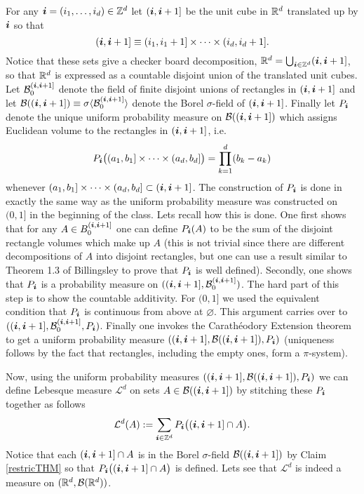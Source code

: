 For any $\boldsymbol i=(i_1,\ldots, i_d)\in\Bbb Z^d$ let $(\boldsymbol i,\boldsymbol i+1]$ be the unit cube in $\Bbb R^d$ translated up by $\boldsymbol i$ so that
\[(\boldsymbol i,\boldsymbol i+1] \equiv (i_1, i_1+1]\times \cdots \times (i_d,i_d + 1].  \]
Notice that these sets give a checker board decomposition, $\Bbb R^d=\bigcup_{\boldsymbol i\in\Bbb Z^d} (\boldsymbol i,\boldsymbol i+1] $, so that $\Bbb R^d$ is expressed as a countable disjoint union of the translated unit cubes. Let $\mathcal B_{0}^{(\boldsymbol i,\boldsymbol i+1] }$ denote the field of finite disjoint unions of rectangles in $(\boldsymbol i,\boldsymbol i+1] $ and let $\mathcal B((\boldsymbol i,\boldsymbol i+1])\equiv \sigma \langle \mathcal B_{0}^{(\boldsymbol i,\boldsymbol i+1] }\rangle $ denote the Borel $\sigma$-field of  $(\boldsymbol i,\boldsymbol i+1]$. Finally let $P_{\boldsymbol i}$ denote the unique uniform probability measure on $\mathcal B((\boldsymbol i,\boldsymbol i+1])$ which assigns Euclidean volume  to the rectangles in  $(\boldsymbol i,\boldsymbol i+1] $, i.e.
\[ P_{\boldsymbol i}\bigl( (a_1,b_1]\times \cdots \times (a_d,b_d]\bigr)=\prod_{k=1}^d (b_k - a_k) \]
whenever $(a_1,b_1]\times \cdots \times (a_d,b_d]\subset (\boldsymbol i,\boldsymbol i+1]$. The construction of $P_{\boldsymbol i}$ is done in exactly the same way as the uniform probability measure was constructed on $(0,1]$ in the beginning of the class. Lets recall how this is done. One first shows that for any $A\in \mathcal \mathcal B_{0}^{(\boldsymbol i,\boldsymbol i+1] }$ one can define $P_{\boldsymbol i}(A)$ to be the sum  of the disjoint rectangle volumes which make up $A$ (this is not trivial since there are different decompositions of $A$ into disjoint rectangles, but one can use a result similar to Theorem 1.3 of Billingsley to prove that $P_{\boldsymbol i}$ is well defined).  Secondly, one shows that $P_{\boldsymbol i}$ is a probability measure on $((\boldsymbol i, \boldsymbol i +1],\mathcal B_{0}^{(\boldsymbol i,\boldsymbol i+1] })$. The hard part of this step is to  show the countable additivity. For $(0,1]$ we used the equivalent condition that  $P_{\boldsymbol i}$ is continuous from above at $\varnothing$. This argument carries over to $((\boldsymbol i, \boldsymbol i +1],\mathcal B_{0}^{(\boldsymbol i,\boldsymbol i+1] }, P_{\boldsymbol i})$. Finally one invokes the Carath\'eodory Extension theorem to get a uniform probability measure $((\boldsymbol i, \boldsymbol i +1],\mathcal B((\boldsymbol i,\boldsymbol i+1]), P_{\boldsymbol i})$ (uniqueness follows by the fact that rectangles, including the empty ones, form a $\pi$-system).

Now, using the uniform probability measures $((\boldsymbol i, \boldsymbol i +1],\mathcal B((\boldsymbol i,\boldsymbol i+1]), P_{\boldsymbol i})$ we can define Lebesque measure $\mathcal L^d$ on sets $A\in\mathcal B((\boldsymbol i,\boldsymbol i+1])$ by stitching these $P_{\boldsymbol i}$ together as follows
\begin{equation}
\label{Lm}
 \mathcal L^d(A):= \sum_{\boldsymbol i\in\Bbb Z^d} P_{\boldsymbol i}\bigl( (\boldsymbol i, \boldsymbol i+1]\cap A\bigr).
 \end{equation}
Notice that each $ (\boldsymbol i, \boldsymbol i+1]\cap A$ is in the Borel $\sigma$-field $\mathcal B((\boldsymbol i,\boldsymbol i+1])$ by Claim \ref{restricTHM} so that
$P_{\boldsymbol i}\bigl( (\boldsymbol i, \boldsymbol i+1]\cap A\bigr)$ is defined.
Lets see that $\mathcal L^d$ is indeed a measure on $(\Bbb R^d,\mathcal B(\Bbb R^d))$.


